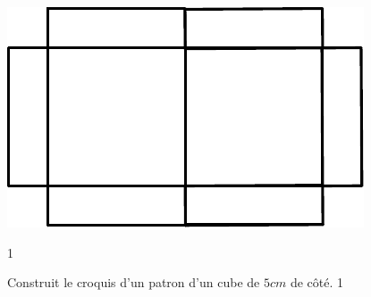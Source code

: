\documentclass[a4paper,11pt]{report}
\begin{document}
\begin{exop}
{\begin{tasks}
			\includegraphics[scale=0.4]{media/es-20/pl8}
\end{tasks}
	}{1}
\end{exop}
\begin{exop}{
	Construit le croquis d'un patron d'un cube de $5cm$ de côté.
	}{1}
\end{exop}
\end{document}
